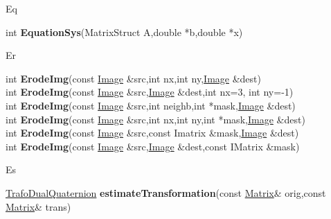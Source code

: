 \documentclass[10pt,titlepage]{article}
\def\functionlistentry#1#2#3#4#5#6{\noindent #1 {\bf #2}(#3) \dotfill #6\\}
\def\letterref#1{}
\def\letterlabel#1{\vspace{0.5cm}\centerline{\Large #1}}
\def\letterlabelend#1{}
\begin{document}
{{\letterlabel{Eq}
\letterref{A}
\letterref{B}
\letterref{C}
\letterref{D}
\letterref{E}
\letterref{F}
\letterref{G}
\letterref{H}
\letterref{I}
\letterref{K}
\letterref{L}
\letterref{M}
\letterref{N}
\letterref{O}
\letterref{P}
\letterref{Q}
\letterref{R}
\letterref{S}
\letterref{T}
\letterref{U}
\letterref{V}
\letterref{W}
\letterref{X}
\letterref{Y}
\letterref{Z}

\letterref{Ed}
\letterref{Ei}
\letterref{El}
\letterref{Eq}
\letterref{Er}
\letterref{Es}
\letterlabelend{Eq}
\functionlistentry{int}{EquationSys}{MatrixStruct A,double *b,double *x}{1125}{matrixAlgebra}{}

\letterlabel{Er}
\letterref{A}
\letterref{B}
\letterref{C}
\letterref{D}
\letterref{E}
\letterref{F}
\letterref{G}
\letterref{H}
\letterref{I}
\letterref{K}
\letterref{L}
\letterref{M}
\letterref{N}
\letterref{O}
\letterref{P}
\letterref{Q}
\letterref{R}
\letterref{S}
\letterref{T}
\letterref{U}
\letterref{V}
\letterref{W}
\letterref{X}
\letterref{Y}
\letterref{Z}

\letterref{Ed}
\letterref{Ei}
\letterref{El}
\letterref{Eq}
\letterref{Er}
\letterref{Es}
\letterlabelend{Er}
\functionlistentry{int}{ErodeImg}{const \hyperlink{Image}{Image} \&src,int nx,int ny,\hyperlink{Image}{Image} \&dest}{367}{filter}{}
\functionlistentry{int}{ErodeImg}{const \hyperlink{Image}{Image} \&src,\hyperlink{Image}{Image} \&dest,int nx=3, int ny=-1}{368}{filter}{}
\functionlistentry{int}{ErodeImg}{const \hyperlink{Image}{Image} \&src,int neighb,int *mask,\hyperlink{Image}{Image} \&dest}{369}{filter}{}
\functionlistentry{int}{ErodeImg}{const \hyperlink{Image}{Image} \&src,int nx,int ny,int *mask,\hyperlink{Image}{Image} \&dest}{370}{filter}{}
\functionlistentry{int}{ErodeImg}{const \hyperlink{Image}{Image} \&src,const Imatrix \&mask,\hyperlink{Image}{Image} \&dest}{371}{filter}{}
\functionlistentry{int}{ErodeImg}{const \hyperlink{Image}{Image} \&src,\hyperlink{Image}{Image} \&dest,const IMatrix \&mask}{372}{filter}{}

\letterlabel{Es}
\letterref{A}
\letterref{B}
\letterref{C}
\letterref{D}
\letterref{E}
\letterref{F}
\letterref{G}
\letterref{H}
\letterref{I}
\letterref{K}
\letterref{L}
\letterref{M}
\letterref{N}
\letterref{O}
\letterref{P}
\letterref{Q}
\letterref{R}
\letterref{S}
\letterref{T}
\letterref{U}
\letterref{V}
\letterref{W}
\letterref{X}
\letterref{Y}
\letterref{Z}

\letterref{Ed}
\letterref{Ei}
\letterref{El}
\letterref{Eq}
\letterref{Er}
\letterref{Es}
\letterlabelend{Es}
\functionlistentry{\hyperlink{TrafoDualQuaternion}{TrafoDualQuaternion}}{estimateTransformation}{const \hyperlink{Matrix}{Matrix}\& orig,const \hyperlink{Matrix}{Matrix}\& trans}{1539}{quaternions}{}

}}
\end{document}
